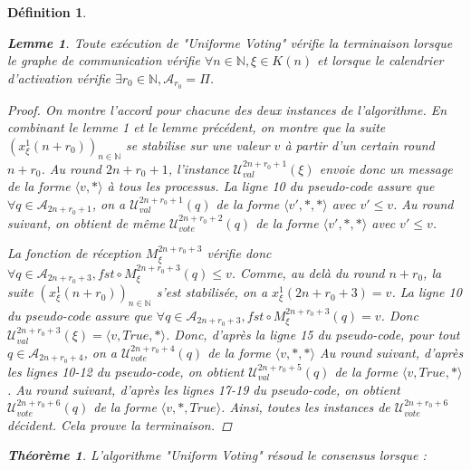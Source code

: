 \documentclass{article}
\newtheorem{lemma}{Lemme}
\newtheorem{theorem}{Théorème}
\newtheorem{definition}{Définition}
\begin{document}
\begin{definition}
	\begin{lemma}
		Toute exécution de "Uniforme Voting" vérifie la terminaison lorsque le graphe de communication vérifie $\forall n \in \mathds{N}, \xi \in K(n)$
		et lorsque le calendrier d'activation vérifie $\exists r_0 \in \mathds{N}, \mathcal{A}_{r_0} = \Pi$.
	\end{lemma}
	\begin{proof}
		On montre l'accord pour chacune des deux instances de l'algorithme.
		En combinant le lemme 1 et le lemme précédent, on montre que la suite $(x^1_\xi(n+r_0))_{n \in \mathds{N}}$ se stabilise sur une valeur $v$ à partir d'un certain round $n+r_0$.
		Au round $2n+r_0+1$, l'instance $\mathcal{U}^{2n+r_0+1}_{val}(\xi)$ envoie donc un message de la forme $\langle v, * \rangle$ à tous les processus.
		La ligne 10 du pseudo-code assure que $\forall q \in \mathcal{A}_{2n+r_0+1}$,
		on a $\mathcal{U}^{2n+r_0+1}_{val}(q)$ de la forme $\langle v', *, * \rangle$ avec $v' \leq v$.
		Au round suivant, on obtient de même $\mathcal{U}^{2n+r_0+2}_{vote}(q)$ de la forme $\langle v', *, * \rangle$ avec $v' \leq v$.

		La fonction de réception $M_\xi^{2n+r_0+3}$ vérifie donc
		$\forall q \in \mathcal{A}_{2n+r_0+3}, fst \circ M_\xi^{2n+r_0+3}(q) \leq v$.
		Comme, au delà du round $n+r_0$, la suite $(x^1_\xi(n+r_0))_{n \in \mathds{N}}$ s'est stabilisée, on a $x^1_\xi(2n+r_0+3) = v$.
		La ligne 10 du pseudo-code assure que $\forall q \in \mathcal{A}_{2n+r_0+3}, fst \circ M_\xi^{2n+r_0+3}(q) = v$.
		Donc $\mathcal{U}_{val}^{2n+r_0+3}(\xi) = \langle v, True, * \rangle$.
		Donc, d'après la ligne 15 du pseudo-code, pour tout $q \in \mathcal{A}_{2n+r_0+4}$, on a $\mathcal{U}_{vote}^{2n+r_0+4}(q)$ de la forme $\langle v, *, * \rangle$
		Au round suivant, d'après les lignes 10-12 du pseudo-code, on obtient $\mathcal{U}^{2n+r_0+5}_{val}(q)$ de la forme $\langle v, True, * \rangle$.
		Au round suivant, d'après les lignes 17-19 du pseudo-code, on obtient $\mathcal{U}^{2n+r_0+6}_{vote}(q)$ de la forme $\langle v, *, True \rangle$.
		Ainsi, toutes les instances de $\mathcal{U}_{vote}^{2n+r_0+6}$ décident.
		Cela prouve la terminaison.

	\end{proof}



\begin{theorem}

	L'algorithme "Uniform Voting" résoud le consensus lorsque :
	\begin{itemize}


\end{itemize}
\end{theorem}
\end{definition}
\end{document}
